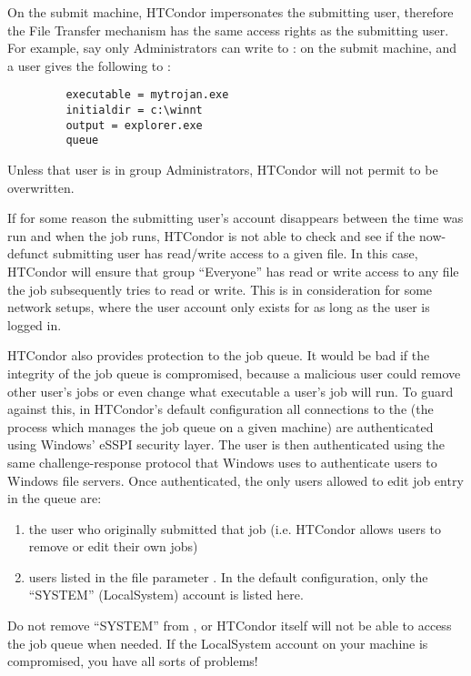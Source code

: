 On the submit machine, HTCondor impersonates the submitting user, therefore
the File Transfer mechanism has the same access rights as the submitting
user.  For example, say only Administrators can write to
\verb@C:\WINNT@
on the submit machine,
and a user gives the following to  :
\begin{verbatim}
         executable = mytrojan.exe
         initialdir = c:\winnt
         output = explorer.exe
         queue
\end{verbatim}
Unless that user is in group Administrators, HTCondor will not permit
 to be overwritten.  

If for some reason the submitting user's account disappears between the time
 was run and when the job runs, HTCondor is not able to check
and see if the now-defunct submitting user has read/write access to a given
file.  In this case, HTCondor will ensure that group ``Everyone'' has read or
write access to any file the job subsequently tries to read or write.  This
is in consideration for some network setups, where the user account only
exists for as long as the user is logged in.

HTCondor also provides protection to the job queue.  It would be bad if the
integrity of the job queue is compromised, because a malicious user could
remove other user's jobs or even change what executable a user's job will
run.  To guard against this, in HTCondor's default configuration all connections to the  (the
process which manages the job queue on a given machine) are authenticated
using Windows' eSSPI security layer.  The user is then authenticated
using the same challenge-response protocol that Windows uses to authenticate
users to Windows file servers.  Once authenticated, the only users
allowed to edit job entry in the queue are:
\begin{enumerate}
\item the user who originally submitted that job (i.e. HTCondor allows users
to remove or edit their own jobs)
\item users listed in the  file parameter
.  In the default configuration, only the
``SYSTEM'' (LocalSystem) account is listed here.  
\end{enumerate}
\Warn Do not remove ``SYSTEM'' from , or
HTCondor itself will not be able to access the job queue when needed.  If the
LocalSystem account on your machine is compromised, you have all sorts of
problems!

